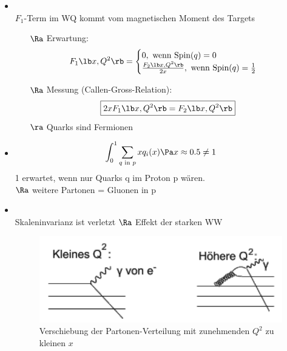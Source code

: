 \begin{itemize}
\newpage
\item {}\\
$F_1$-Term im WQ kommt vom magnetischen Moment des Targets
\begin{itemize}
\item[$\Ra$] Erwartung:
\begin{align}
F_1\lb  x, Q^2\rb  = \begin{cases}0, \text{ wenn Spin}(q) = 0\\ 
\frac{F_2\lb x, Q^2\rb }{2x}, \text{ wenn Spin}(q) = \frac{1}{2} \end{cases}
\end{align}
\item[$\Ra$] Messung (Callen-Gross-Relation):
\begin{align}
\boxed{ 2xF_1\lb x, Q^2\rb  = F_2 \lb  x, Q^2\rb  }
\end{align}
$\ra$ Quarks sind Fermionen
\end{itemize}
\item {}
\begin{align}
\int_0^1 \sum_{q\text{ in } p} x q_i(x) \Pa x \approx 0.5 \neq 1
\end{align}
1 erwartet, wenn nur Quarks q im Proton p wären.\\
$\Ra$ weitere Partonen = Gluonen in p
\newpage

\item {}\\
Skaleninvarianz ist verletzt $\Ra$ Effekt der starken WW

\begin{figure}[!ht]
\centering
\includegraphics[width=.6\textwidth]{imgs/ep5-fig-6-10.pdf}
\caption{Verschiebung der Partonen-Verteilung mit zunehmenden $Q^2$ zu kleinen $x$\label{fig:6.10}}
\end{figure}
\end{itemize}
